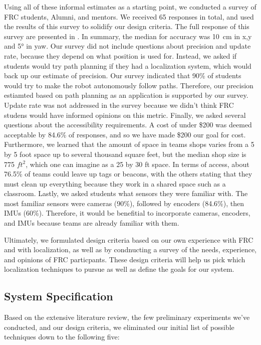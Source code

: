 \documentclass{article}
\begin{document}
Using all of these informal estimates as a starting point, we conducted a survey of FRC students, Alumni, and mentors. We received 65 responses in total, and used the results of this survey to solidify our design criteria. The full response of this survey are presented in . In summary, the median for accuracy was \SI{10}{\centi\meter} in x,y and \ang{5} in yaw. Our survey did not include questions about precision and update rate, because they depend on what position is used for. Instead, we asked if students would try path planning if they had a localization system, which would back up our estimate of precision. Our survey indicated that 90\% of students would try to make the robot autonomously follow paths. Therefore, our precision estiamted based on path planning as an application is supported by our survey. Update rate was not addressed in the survey because we didn't think FRC studens would have informed opinions on this metric. Finally, we asked several questions about the accessibility requirements. A cost of under \$200 was deemed acceptable by 84.6\% of responses, and so we have made \$200 our goal for cost. Furthermore, we learned that the amount of space in teams shops varies from a 5 by 5 foot space up to several thousand square feet, but the median shop size is 775 $ft^2$, which one can imagine as a 25 by 30 ft space. In terms of access, about 76.5\% of teams could leave up tags or beacons, with the others stating that they must clean up everything because they work in a shared space such as a classroom. Lastly, we asked students what sensors they were familiar with. The most familiar sensors were cameras (90\%), followed by encoders (84.6\%), then IMUs (60\%). Therefore, it would be benefitial to incorporate cameras, encoders, and IMUs because teams are already familiar with them.

Ultimately, we formulated design criteria based on our own experience with FRC and with localization, as well as by condnucting a survey of the needs, experience, and opinions of FRC particpants. These design criteria will help us pick which localization techniques to pursue as well as define the goals for our system.

\subsection{System Specification}

Based on the extensive literature review, the few preliminary experiments we've conducted, and our design criteria, we eliminated our initial list of possible techniques down to the following five:
\end{document}
